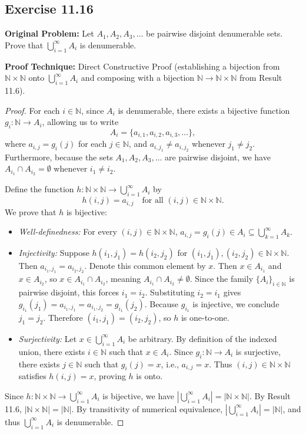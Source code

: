 \documentclass[11pt, letterpaper]{article}
\theoremstyle{definition}
\theoremstyle{remark}
\begin{document}
\subsection{Exercise 11.16}

\textbf{Original Problem:} Let $A_1, A_2, A_3, \dots$ be pairwise disjoint denumerable sets. Prove that $\bigcup_{i=1}^{\infty} A_i$ is denumerable.

\textbf{Proof Technique:} Direct Constructive Proof (establishing a bijection from $\mathbb{N} \times \mathbb{N}$ onto $\bigcup_{i=1}^{\infty} A_i$ and composing with a bijection $\mathbb{N} \to \mathbb{N} \times \mathbb{N}$ from Result 11.6).

\begin{proof}
For each $i \in \mathbb{N}$, since $A_i$ is denumerable, there exists a bijective function $g_i : \mathbb{N} \to A_i$, allowing us to write
\[
A_i = \{a_{i, 1}, a_{i, 2}, a_{i, 3}, \dots\},
\]
where $a_{i, j} = g_i(j)$ for each $j \in \mathbb{N}$, and $a_{i, j_1} \neq a_{i, j_2}$ whenever $j_1 \neq j_2$. Furthermore, because the sets $A_1, A_2, A_3, \dots$ are pairwise disjoint, we have $A_{i_1} \cap A_{i_2} = \emptyset$ whenever $i_1 \neq i_2$.

Define the function $h : \mathbb{N} \times \mathbb{N} \to \bigcup_{i=1}^{\infty} A_i$ by
\[
h(i, j) = a_{i, j} \quad \text{for all } (i, j) \in \mathbb{N} \times \mathbb{N}.
\]
We prove that $h$ is bijective:
\begin{itemize}
    \item \emph{Well-definedness:} For every $(i, j) \in \mathbb{N} \times \mathbb{N}$, $a_{i, j} = g_i(j) \in A_i \subseteq \bigcup_{k=1}^{\infty} A_k$.
    \item \emph{Injectivity:} Suppose $h(i_1, j_1) = h(i_2, j_2)$ for $(i_1, j_1), (i_2, j_2) \in \mathbb{N} \times \mathbb{N}$. Then $a_{i_1, j_1} = a_{i_2, j_2}$. Denote this common element by $x$. Then $x \in A_{i_1}$ and $x \in A_{i_2}$, so $x \in A_{i_1} \cap A_{i_2}$, meaning $A_{i_1} \cap A_{i_2} \neq \emptyset$. Since the family $\{A_i\}_{i \in \mathbb{N}}$ is pairwise disjoint, this forces $i_1 = i_2$. Substituting $i_2 = i_1$ gives $g_{i_1}(j_1) = a_{i_1, j_1} = a_{i_1, j_2} = g_{i_1}(j_2)$. Because $g_{i_1}$ is injective, we conclude $j_1 = j_2$. Therefore $(i_1, j_1) = (i_2, j_2)$, so $h$ is one-to-one.
    \item \emph{Surjectivity:} Let $x \in \bigcup_{i=1}^{\infty} A_i$ be arbitrary. By definition of the indexed union, there exists $i \in \mathbb{N}$ such that $x \in A_i$. Since $g_i : \mathbb{N} \to A_i$ is surjective, there exists $j \in \mathbb{N}$ such that $g_i(j) = x$, i.e., $a_{i, j} = x$. Thus $(i, j) \in \mathbb{N} \times \mathbb{N}$ satisfies $h(i, j) = x$, proving $h$ is onto.
\end{itemize}
Since $h : \mathbb{N} \times \mathbb{N} \to \bigcup_{i=1}^{\infty} A_i$ is bijective, we have $\left|\bigcup_{i=1}^{\infty} A_i\right| = |\mathbb{N} \times \mathbb{N}|$. By Result 11.6, $|\mathbb{N} \times \mathbb{N}| = |\mathbb{N}|$. By transitivity of numerical equivalence, $\left|\bigcup_{i=1}^{\infty} A_i\right| = |\mathbb{N}|$, and thus $\bigcup_{i=1}^{\infty} A_i$ is denumerable.
\end{proof}
\end{document}
